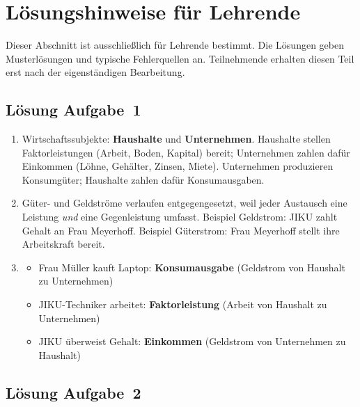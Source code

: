\documentclass[11pt, a4paper]{article}
\begin{document}
\newpage
\section*{Lösungshinweise für Lehrende}
\label{loesungen}

\begin{merksatz}[title={\bfseries Hinweis zur Nutzung}]
Dieser Abschnitt ist ausschließlich für Lehrende bestimmt. Die Lösungen geben
Musterlösungen und typische Fehlerquellen an. Teilnehmende erhalten diesen Teil
erst nach der eigenständigen Bearbeitung.
\end{merksatz}

\subsection*{Lösung Aufgabe~1}

\begin{enumerate}[label=(\alph*)]
  \item Wirtschaftssubjekte: \textbf{Haushalte} und \textbf{Unternehmen}.
  Haushalte stellen Faktorleistungen (Arbeit, Boden, Kapital) bereit; Unternehmen zahlen
  dafür Einkommen (Löhne, Gehälter, Zinsen, Miete). Unternehmen produzieren Konsumgüter;
  Haushalte zahlen dafür Konsumausgaben.

  \item Güter- und Geldströme verlaufen entgegengesetzt, weil jeder Austausch eine
  Leistung \emph{und} eine Gegenleistung umfasst. Beispiel Geldstrom: JIKU zahlt Gehalt
  an Frau Meyerhoff. Beispiel Güterstrom: Frau Meyerhoff stellt ihre Arbeitskraft bereit.

  \item
  \begin{itemize}
    \item Frau Müller kauft Laptop: \textbf{Konsumausgabe} (Geldstrom von Haushalt zu Unternehmen)
    \item JIKU-Techniker arbeitet: \textbf{Faktorleistung} (Arbeit von Haushalt zu Unternehmen)
    \item JIKU überweist Gehalt: \textbf{Einkommen} (Geldstrom von Unternehmen zu Haushalt)
  \end{itemize}
\end{enumerate}

\subsection*{Lösung Aufgabe~2}
\end{document}
